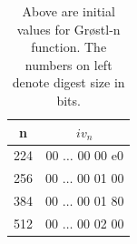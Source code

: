   \begin{table}
    \begin{center}
      \begin{tabular}{ *{2}{c} } \hline
        n   & $iv_{n}$         \\ \hline
        224 & 00 $\dots$ 00 00 e0 \\
        256 & 00 $\dots$ 00 01 00 \\
        384 & 00 $\dots$ 00 01 80 \\
        512 & 00 $\dots$ 00 02 00 \\ \hline
      \end{tabular}
    \caption{Above are initial values for Gr{\o}stl-n function. The numbers on left denote digest size in bits.\cite{00019}}
    \end{center}
  \end{table}



